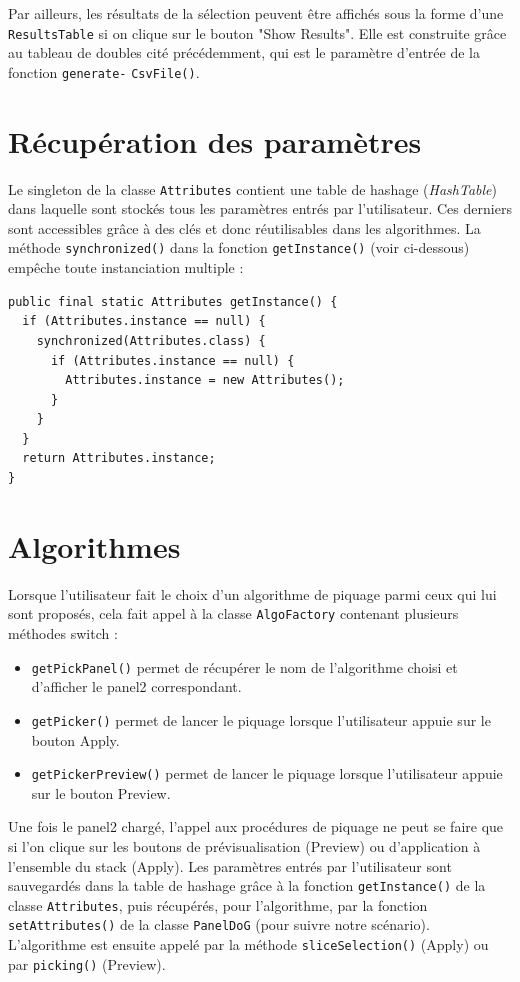 Par ailleurs, les résultats de la sélection peuvent être affichés sous la forme d'une \texttt{ResultsTable} si on clique sur le bouton "Show Results". Elle est construite grâce au tableau de doubles cité précédemment, qui est le paramètre d'entrée de la fonction \texttt{generate-} \texttt{CsvFile()}. 

\section{Récupération des paramètres}

Le singleton de la classe \texttt{Attributes} contient une table de hashage (\emph{HashTable}) dans laquelle sont stockés tous les paramètres entrés par l'utilisateur. Ces derniers sont accessibles grâce à des clés et donc réutilisables dans les algorithmes. La méthode  \texttt{synchronized()} dans la fonction \texttt{getInstance()} (voir ci-dessous) empêche toute instanciation multiple :

\begin{small}
\begin{lstlisting}
public final static Attributes getInstance() {
  if (Attributes.instance == null) {
    synchronized(Attributes.class) {
      if (Attributes.instance == null) {
        Attributes.instance = new Attributes();
      }
    }
  }
  return Attributes.instance;
}
\end{lstlisting}
\end{small}	

\section{Algorithmes}

Lorsque l'utilisateur fait le choix d'un algorithme de piquage parmi ceux qui lui sont proposés, cela fait appel à la classe \texttt{AlgoFactory} contenant plusieurs méthodes switch :
\begin{itemize}
\item \texttt{getPickPanel()} permet de récupérer le nom de l'algorithme choisi et d'afficher le panel2 correspondant.
\item \texttt{getPicker()} permet de lancer le piquage lorsque l'utilisateur appuie sur le bouton Apply.
\item \texttt{getPickerPreview()} permet de lancer le piquage lorsque l'utilisateur appuie sur le bouton Preview.
\end{itemize}

Une fois le panel2 chargé, l'appel aux procédures de piquage ne peut se faire que si l'on clique sur les boutons de prévisualisation (Preview) ou d'application à l'ensemble du stack (Apply). Les paramètres entrés par l'utilisateur sont sauvegardés dans la table de hashage grâce à la fonction \texttt{getInstance()} de la classe \texttt{Attributes}, puis récupérés, pour l'algorithme, par la fonction \texttt{setAttributes()} de la classe \texttt{PanelDoG} (pour suivre notre scénario). L'algorithme est ensuite appelé par la méthode \texttt{sliceSelection()} (Apply) ou par \texttt{picking()} (Preview). \\

